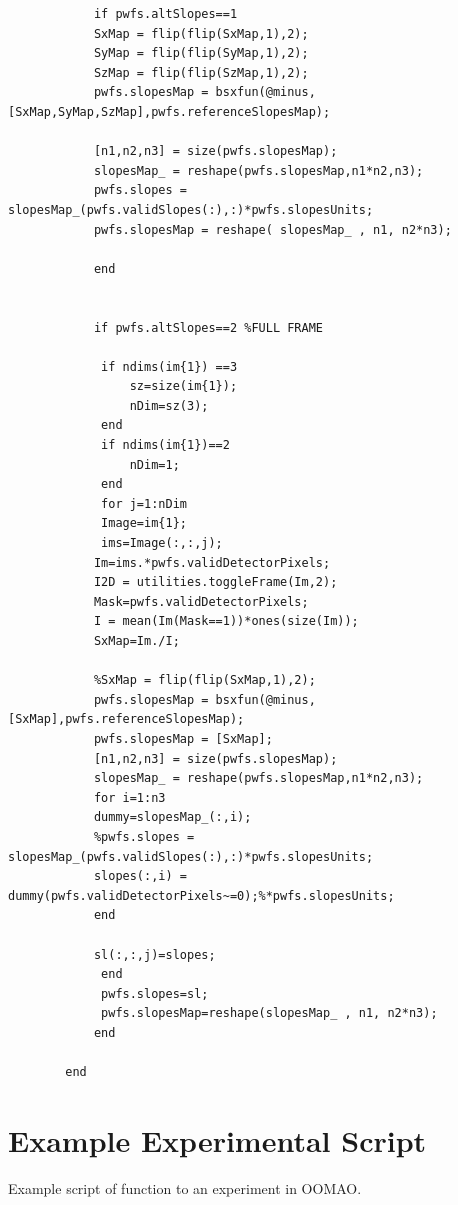 \begin{lstlisting}
            if pwfs.altSlopes==1
            SxMap = flip(flip(SxMap,1),2);
            SyMap = flip(flip(SyMap,1),2);
            SzMap = flip(flip(SzMap,1),2);
            pwfs.slopesMap = bsxfun(@minus,[SxMap,SyMap,SzMap],pwfs.referenceSlopesMap);
            
            [n1,n2,n3] = size(pwfs.slopesMap);
            slopesMap_ = reshape(pwfs.slopesMap,n1*n2,n3);
            pwfs.slopes = slopesMap_(pwfs.validSlopes(:),:)*pwfs.slopesUnits;
            pwfs.slopesMap = reshape( slopesMap_ , n1, n2*n3);
                
            end
            

            if pwfs.altSlopes==2 %FULL FRAME
             
             if ndims(im{1}) ==3
                 sz=size(im{1});
                 nDim=sz(3);
             end
             if ndims(im{1})==2
                 nDim=1;
             end
             for j=1:nDim
             Image=im{1};
             ims=Image(:,:,j);
            Im=ims.*pwfs.validDetectorPixels;    
            I2D = utilities.toggleFrame(Im,2);
            Mask=pwfs.validDetectorPixels;
            I = mean(Im(Mask==1))*ones(size(Im));
            SxMap=Im./I;  
            
            %SxMap = flip(flip(SxMap,1),2);
            pwfs.slopesMap = bsxfun(@minus,[SxMap],pwfs.referenceSlopesMap);
            pwfs.slopesMap = [SxMap];
            [n1,n2,n3] = size(pwfs.slopesMap);
            slopesMap_ = reshape(pwfs.slopesMap,n1*n2,n3);
            for i=1:n3
            dummy=slopesMap_(:,i);
            %pwfs.slopes = slopesMap_(pwfs.validSlopes(:),:)*pwfs.slopesUnits;
            slopes(:,i) = dummy(pwfs.validDetectorPixels~=0);%*pwfs.slopesUnits;
            end  
            
            sl(:,:,j)=slopes;
             end
             pwfs.slopes=sl;   
             pwfs.slopesMap=reshape(slopesMap_ , n1, n2*n3);
            end
            
        end
\end{lstlisting}

\section{Example Experimental Script}\label{oomaoexamp}

Example script of function to an experiment in OOMAO.

